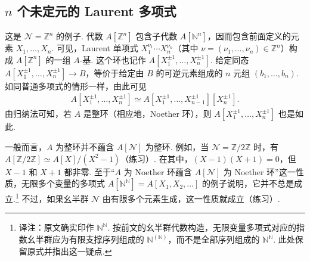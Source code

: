\subsection{$n$ 个未定元的 Laurent 多项式}\label{sec:galois-1-4-7}
这是 $\mathcal N=\mathbb Z^n$ 的例子. 代数 $A[\mathbb Z^n]$ 包含子代数 $A[\mathbb N^n]$，因而包含前面定义的元素 $X_1,\ldots,X_n$. 可见，Laurent 单项式 $X_1^{\nu_1}\cdots X_n^{\nu_n}$（其中 $\nu=(\nu_1,\ldots,\nu_n)\in\mathbb Z^n$）构成 $A[\mathbb Z^n]$ 的一组 $A$-基. 这个环也记作 $A[X_1^{\pm1},\ldots,X_n^{\pm1}]$. 给定同态 $A[X_1^{\pm1},\ldots,X_n^{\pm1}]\longrightarrow B$，等价于给定由 $B$ 的可逆元素组成的 $n$ 元组 $(b_1,\ldots,b_n)$. 如同普通多项式的情形一样，由此可见
\begin{align*}
A[X_1^{\pm1},\ldots,X_n^{\pm1}]\simeq A[X_1^{\pm1},\ldots,X_{n-1}^{\pm1}][X_n^{\pm1}].
\end{align*}
由归纳法可知，若 $A$ 是整环（相应地，Noether 环），则 $A[X_1^{\pm1},\ldots,X_n^{\pm1}]$ 也是如此.
\begin{remark*}
一般而言，$A$ 为整环并不蕴含 $A[\mathcal N]$ 为整环. 例如，当 $\mathcal N=\mathbb Z/2\mathbb Z$ 时，有 $A[\mathbb Z/2\mathbb Z]\simeq A[X]/(X^2-1)$（练习）. 在其中，$(X-1)(X+1)=0$，但 $X-1$ 和 $X+1$ 都非零. 至于``$A$ 为 Noether 环蕴含 $A[\mathcal N]$ 为 Noether 环''这一性质，无限多个变量的多项式 $A[\mathbb N^{\mathbb N}]=A[X_1,X_2,\ldots]$ 的例子说明，它并不总是成立.\footnote{译注：原文确实印作 $\mathbb N^{\mathbb N}$. 按前文的幺半群代数构造，无限变量多项式对应的指数幺半群应为有限支撑序列组成的 $\mathbb N^{(\mathbb N)}$，而不是全部序列组成的 $\mathbb N^{\mathbb N}$. 此处保留原式并指出这一疑点.} 不过，如果幺半群 $\mathcal N$ 由有限多个元素生成，这一性质就成立（练习）.
\end{remark*}



